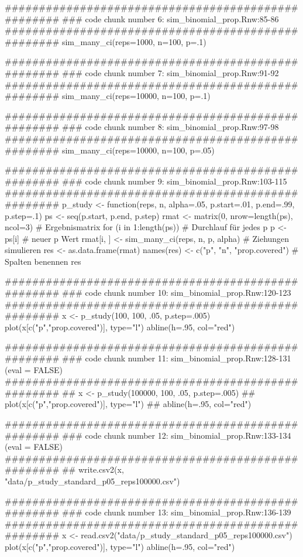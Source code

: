 ###################################################
### code chunk number 6: sim_binomial_prop.Rnw:85-86
###################################################
sim_many_ci(reps=1000, n=100, p=.1)  


###################################################
### code chunk number 7: sim_binomial_prop.Rnw:91-92
###################################################
sim_many_ci(reps=10000, n=100, p=.1)  


###################################################
### code chunk number 8: sim_binomial_prop.Rnw:97-98
###################################################
sim_many_ci(reps=10000, n=100, p=.05)  


###################################################
### code chunk number 9: sim_binomial_prop.Rnw:103-115
###################################################
p_study <- function(reps, n, alpha=.05,
                    p.start=.01, p.end=.99, p.step=.1){  
  ps <- seq(p.start, p.end, p.step)                   
  rmat <- matrix(0, nrow=length(ps), ncol=3)    # Ergebnismatrix
  for (i in 1:length(ps)){                      # Durchlauf für jedes p
    p <- ps[i]                                  # neuer p Wert
    rmat[i, ] <- sim_many_ci(reps, n, p, alpha) # Ziehungen simulieren 
  } 
  res <- as.data.frame(rmat)                   
  names(res) <- c("p", "n", "prop.covered")     # Spalten benennen 
  res
} 


###################################################
### code chunk number 10: sim_binomial_prop.Rnw:120-123
###################################################
x <- p_study(100, 100, .05, p.step=.005)
plot(x[c("p","prop.covered")], type="l") 
abline(h=.95, col="red")


###################################################
### code chunk number 11: sim_binomial_prop.Rnw:128-131 (eval = FALSE)
###################################################
## x <- p_study(100000, 100, .05, p.step=.005) 
## plot(x[c("p","prop.covered")], type="l") 
## abline(h=.95, col="red")


###################################################
### code chunk number 12: sim_binomial_prop.Rnw:133-134 (eval = FALSE)
###################################################
## write.csv2(x, "data/p_study_standard_p05_reps100000.csv")


###################################################
### code chunk number 13: sim_binomial_prop.Rnw:136-139
###################################################
x <- read.csv2("data/p_study_standard_p05_reps100000.csv")
plot(x[c("p","prop.covered")], type="l") 
abline(h=.95, col="red")


